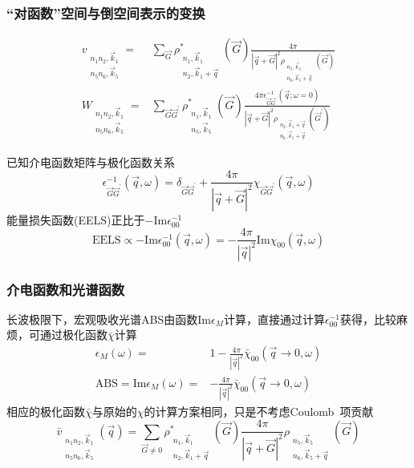 \documentclass[cjk,slidestop,compress,mathserif,blue]{beamer}
\begin{document}
\frame
{
	\frametitle{“对函数”空间与倒空间表示的变换}
	\begin{displaymath}
		\begin{aligned}
			v_{\substack{n_1n_2,\vec k_1\\n_5n_6,\vec k_5}}=&\sum_{\vec G}\rho_{\substack{n_1,\vec k_1\\n_2,\vec k_1+\vec q}}^{\ast}(\vec G)\frac{4\pi}{|\vec q+\vec G|^2\rho_{\substack{n_5,\vec k_5\\n_6,\vec k_5+\vec q}}(\vec G)}\\
			W_{\substack{n_1n_2,\vec k_1\\n_5n_6,\vec k_5}}=&\sum_{\vec G\vec G^{\prime}}\rho_{\substack{n_1,\vec k_1\\n_5,\vec k_5}}^{\ast}(\vec G)\frac{4\pi\epsilon_{\vec G\vec G^{\prime}}^{-1}(\vec q;\omega=0)}{|\vec q+\vec G|^2\rho_{\substack{n_2,\vec k_1+\vec q\\n_6,\vec k_5+\vec q}}(\vec G^{\prime})}
		\end{aligned}
	\end{displaymath}

	已知介电函数矩阵与极化函数关系
	\begin{displaymath}
		\epsilon_{\vec G\vec G^{\prime}}^{-1}(\vec q,\omega)=\delta_{\vec G\vec G^{\prime}}+\frac{4\pi}{|\vec q+\vec G|^2}\chi_{\vec G\vec G^{\prime}}(\vec q,\omega)
	\end{displaymath}
	能量损失函数(\textrm{EELS})正比于$-\mathrm{Im}\epsilon_{00}^{-1}$
	\begin{displaymath}
		\mathrm{EELS}\propto-\mathrm{Im}\epsilon_{00}^{-1}(\vec q,\omega)=-\frac{4\pi}{|\vec q|^2}\mathrm{Im}\chi_{00}(\vec q,\omega)
	\end{displaymath}
}

\frame
{
	\frametitle{介电函数和光谱函数}
	长波极限下，宏观吸收光谱\textrm{ABS}由函数$\mathrm{Im}\epsilon_M$计算，直接通过计算$\epsilon_{00}^{-1}$获得，比较麻烦，可通过极化函数$\bar\chi$计算
	\begin{displaymath}
		\begin{aligned}
			\epsilon_M(\omega)=&1-\frac{4\pi}{|\vec q|^2}\bar{\chi}_{00}(\vec q\rightarrow0,\omega)\\
			\mathrm{ABS}=\mathrm{Im}\epsilon_M(\omega)=&-\frac{4\pi}{|\vec q|^2}\bar{\chi}_{00}(\vec q\rightarrow0,\omega)
		\end{aligned}
	\end{displaymath}
	相应的极化函数$\bar{\chi}$与原始的$\chi$的计算方案相同，只是不考虑\textrm{Coulomb~}项贡献
	\begin{displaymath}
		\bar{v}_{\substack{n_1n_2,\vec k_1\\n_5n_6,\vec k_5}}(\vec q)=\sum_{\vec G\neq0}\rho_{\substack{n_1,\vec k_1\\n_2,\vec k_1+\vec q}}^{\ast}(\vec G)\frac{4\pi}{|\vec q+\vec G|^2}\rho_{\substack{n_5,\vec k_5\\n_6,\vec k_5+\vec q}}(\vec G)
	\end{displaymath}
}
\end{document}
